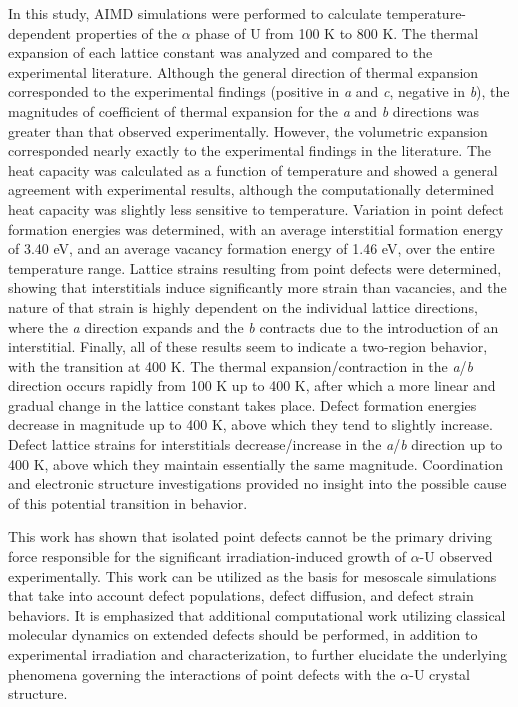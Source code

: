 \documentclass[utf8]{frontiersSCNS} %
\begin{document}
In this study, AIMD simulations were performed to calculate temperature-dependent properties of the $\alpha$ phase of U from 100 K to 800 K. The thermal expansion of each lattice constant was analyzed and compared to the experimental literature. Although the general direction of thermal expansion corresponded to the experimental findings (positive in \textit{a} and \textit{c}, negative in \textit{b}), the magnitudes of coefficient of thermal expansion for the \textit{a} and \textit{b} directions was greater than that observed experimentally. However, the volumetric expansion corresponded nearly exactly to the experimental findings in the literature. The heat capacity was calculated as a function of temperature and showed a general agreement with experimental results, although the computationally determined heat capacity was slightly less sensitive to temperature. Variation in point defect formation energies was determined, with an average interstitial formation energy of 3.40 eV, and an average vacancy formation energy of 1.46 eV, over the entire temperature range. Lattice strains resulting from point defects were determined, showing that interstitials induce significantly more strain than vacancies, and the nature of that strain is highly dependent on the individual lattice directions, where the \textit{a} direction expands and the \textit{b} contracts due to the introduction of an interstitial. Finally, all of these results seem to indicate a two-region behavior, with the transition at 400 K. The thermal expansion/contraction in the \textit{a}/\textit{b} direction occurs rapidly from 100 K up to 400 K, after which a more linear and gradual change in the lattice constant takes place. Defect formation energies decrease in magnitude up to 400 K, above which they tend to slightly increase. Defect lattice strains for interstitials decrease/increase in the \textit{a}/\textit{b} direction up to 400 K, above which they maintain essentially the same magnitude. Coordination and electronic structure investigations provided no insight into the possible cause of this potential transition in behavior. 

This work has shown that isolated point defects cannot be the primary driving force responsible for the significant irradiation-induced growth of $\alpha$-U observed experimentally. This work can be utilized as the basis for mesoscale simulations that take into account defect populations, defect diffusion, and defect strain behaviors. It is emphasized that additional computational work utilizing classical molecular dynamics on extended defects should be performed, in addition to experimental irradiation and characterization, to further elucidate the underlying phenomena governing the interactions of point defects with the $\alpha$-U crystal structure. 
\end{document}

